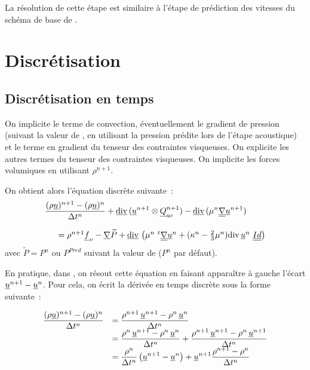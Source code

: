La résolution de cette étape est similaire à l'étape
de prédiction des vitesses du schéma de base de \CS.

\section*{Discrétisation}
\subsection*{Discrétisation en temps}

On implicite le terme de convection, éventuellement
le gradient de pression (suivant la valeur de , en utilisant la
pression prédite lors de l'étape acoustique) et le terme en gradient
du tenseur des contraintes visqueuses.
On explicite les autres termes du tenseur des contraintes visqueuses.
On implicite les forces
volumiques en utilisant $\rho^{n+1}$.

On obtient alors l'équation discrète suivante~:
\begin{equation}\label{Cfbl_Cfqdmv_eq_vitesse_cfqdmv}
\begin{array}{l}
\displaystyle\frac{(\rho\underline{u})^{n+1}-(\rho\underline{u})^n}{\Delta t^n}
+ \underline{\text{div}}\,(\underline{u}^{n+1} \otimes \underline{Q}_{ac}^{n+1})
- \underline{\text{div}}\,(\mu^n \underline{\underline{{\nabla}}}{\underline{u}^{n+1}})\\
\\
\text{\ \ \ \ }= \rho^{n+1} \underline{f}_v - \underline{\nabla}{\widetilde{P}}
+ \underline{\text{div}}\,\left(\mu^n\ ^t\underline{\underline{{\nabla}}}{\underline{u}^n}
+ (\kappa^n-\frac{2}{3}\mu^n)\text{div}\,{\underline{u}^n}\ \underline{\underline{Id}}\right)\\
\end{array}
\end{equation}
avec $\widetilde{P}=P^n\text{ ou }P^{Pred}$ suivant la valeur de 
($P^n$ par défaut).

En pratique, dans \CS, on résout cette équation en faisant apparaître à
gauche l'écart $\underline{u}^{n+1} - \underline{u}^n$. Pour cela, on écrit la
dérivée en temps discrète sous la forme suivante~:

\begin{equation}
\begin{array}{ll}
\displaystyle
\frac{(\rho \underline{u})^{n+1} - (\rho \underline{u})^n}{\Delta t^n}
& =
\displaystyle
\frac{\rho^{n+1}\, \underline{u}^{n+1} - \rho^n\, \underline{u}^n}{\Delta t^n}\\
& =
\displaystyle
\frac{\rho^{n}\, \underline{u}^{n+1} - \rho^n\, \underline{u}^n}{\Delta t^n}+
\frac{\rho^{n+1}\, \underline{u}^{n+1} - \rho^n\, \underline{u}^{n+1}}{\Delta t^n}\\
& =
\displaystyle
\frac{\rho^{n}}{\Delta t^n}\left(\underline{u}^{n+1} - \underline{u}^n\right)+
\underline{u}^{n+1}\frac{\rho^{n+1} - \rho^n}{\Delta t^n}
\end{array}
\end{equation}

